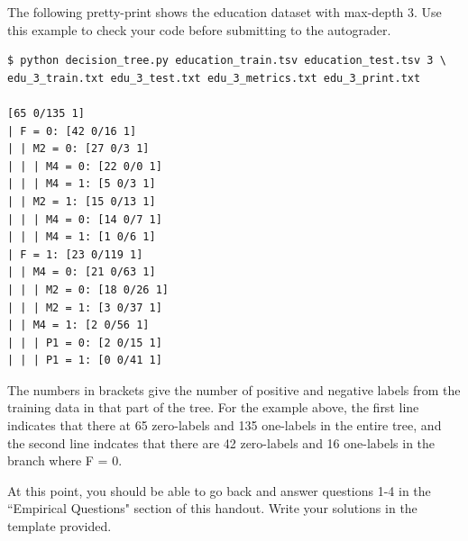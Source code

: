 \documentclass[11pt,addpoints,answers]{exam}
\begin{document}
The following pretty-print shows the education dataset with max-depth 3.  Use this example to check your code before submitting to the autograder.  

\begin{lstlisting}[language=Shell]
$ python decision_tree.py education_train.tsv education_test.tsv 3 \
edu_3_train.txt edu_3_test.txt edu_3_metrics.txt edu_3_print.txt

[65 0/135 1]
| F = 0: [42 0/16 1]
| | M2 = 0: [27 0/3 1]
| | | M4 = 0: [22 0/0 1]
| | | M4 = 1: [5 0/3 1]
| | M2 = 1: [15 0/13 1]
| | | M4 = 0: [14 0/7 1]
| | | M4 = 1: [1 0/6 1]
| F = 1: [23 0/119 1]
| | M4 = 0: [21 0/63 1]
| | | M2 = 0: [18 0/26 1]
| | | M2 = 1: [3 0/37 1]
| | M4 = 1: [2 0/56 1]
| | | P1 = 0: [2 0/15 1]
| | | P1 = 1: [0 0/41 1]
\end{lstlisting}

The numbers in brackets give the number of positive and negative labels from the training data in that part of the tree. For the example above, the first line indicates that there at 65 zero-labels and 135 one-labels in the entire tree, and the second line indcates that there are 42 zero-labels and 16 one-labels in the branch where F = 0.

\begin{notebox}
At this point, you should be able to go back and answer questions 1-4 in the ``Empirical Questions" section of this handout.  Write your solutions in the template provided. \end{notebox}
\end{document}
